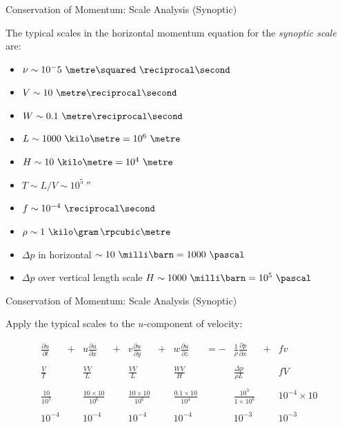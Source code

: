 \begin{frame}{Conservation of Momentum: Scale Analysis (Synoptic)}

The typical scales in the horizontal momentum equation for the \textit{synoptic scale} are:

\begin{itemize}
\item $\nu \sim 10^-5\ \metre\squared\ \reciprocal\second$
\item $V \sim 10\ \metre\reciprocal\second$
\item $W \sim 0.1\ \metre\reciprocal\second$
\item $L \sim 1000\ \kilo\metre = 10^6\ \metre$
\item $H \sim 10\ \kilo\metre = 10^4\ \metre$
\item $T \sim L/V \sim 10^5\ \second$
\item $f \sim 10^{-4}\ \reciprocal\second$
\item $\rho \sim 1\ \kilo\gram \, \rpcubic\metre$
\item $\Delta p$ in horizontal $\sim 10\ \milli\barn = 1000\ \pascal$
\item $\Delta p$ over vertical length scale $H \sim 1000\ \milli\barn = 10^5\ \pascal$
\end{itemize}
\end{frame}

\begin{frame}{Conservation of Momentum: Scale Analysis (Synoptic)}

Apply the typical scales to the $u$-component of velocity:

\begin{align*}
&\frac{\partial u}{\partial t}& + &u \frac{\partial u}{\partial x}& + &v \frac{\partial u}{\partial y}&+ &w \frac{\partial u}{\partial z}& = -& \frac{1}{\rho} \frac{\partial p}{\partial x}& + &fv& \\\\
&\frac{V}{T}&  &\frac{VV}{L}& &\frac{VV}{L}& &\frac{WV}{H}& &\frac{\Delta p}{\rho L}& &fV&\\\\
&\frac{10}{10^5}& &\frac{10\times10}{10^6}& &\frac{10\times10}{10^6}& &\frac{0.1 \times 10}{10^4}& &\frac{10^3}{1 \times 10^6}& &10^{-4} \times 10&\\\\
&10^{-4}& &10^{-4}& &10^{-4}& &10^{-4}& &10^{-3}& &10^{-3}&
\end{align*}
\end{frame}

